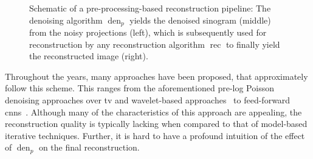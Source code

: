 \documentclass[../ml-ct.tex]{subfiles}
\begin{document}
\begin{figure}
	\caption[Schematic of a pre-processing-based reconstruction pipeline.]{
		Schematic of a pre-processing-based reconstruction pipeline:
		The denoising algorithm \( \operatorname{den}_p \) yields the denoised sinogram (middle) from the noisy projections (left), which is subsequently used for reconstruction by any reconstruction algorithm \( \operatorname{rec} \) to finally yield the reconstructed image (right).
	}%
	\label{fig:learning:preprocessing scheme}
\end{figure}

Throughout the years, many approaches have been proposed, that approximately follow this scheme.
This ranges from the aforementioned pre-log Poisson denoising approaches over \gls{tv} and wavelet-based approaches~\cite{jiao_multiscale_2008,karimi_denoising_2016} to feed-forward \glspl{cnn}~\cite{ghani_cnn_2018}.
Although many of the characteristics of this approach are appealing, the reconstruction quality is typically lacking when compared to that of model-based iterative techniques.
Further, it is hard to have a profound intuition of the effect of \( \operatorname{den}_p \) on the final reconstruction.
\end{document}
